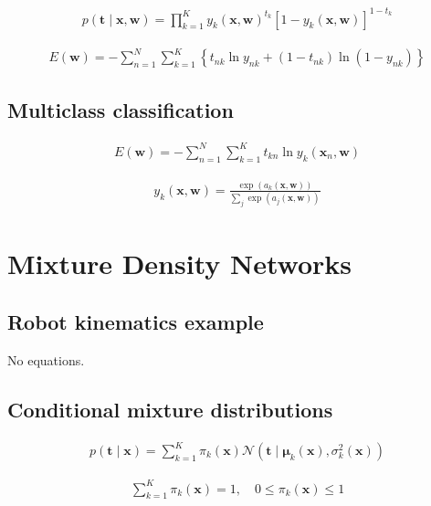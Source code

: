 \documentclass{article}
\begin{document}
\begin{align*}
p(\mathbf{t} \mid \mathbf{x}, \mathbf{w})=\prod_{k=1}^{K} y_{k}(\mathbf{x}, \mathbf{w})^{t_{k}}\left[ 1-y_{k}(\mathbf{x}, \mathbf{w})\right]^{1-t_{k}} 
\tag{6.34}
\end{align*}

\begin{align*}
E(\mathbf{w})=-\sum_{n=1}^{N} \sum_{k=1}^{K}\left\{t_{n k} \ln y_{n k}+\left(1-t_{n k}\right) \ln \left(1-y_{n k}\right)\right\} 
\tag{6.35}
\end{align*}

\subsection{Multiclass classification}

\begin{align*}
E(\mathbf{w})=-\sum_{n=1}^{N} \sum_{k=1}^{K} t_{k n} \ln y_{k}\left(\mathbf{x}_{n}, \mathbf{w}\right) 
\tag{6.36}
\end{align*}

\begin{align*}
y_{k}(\mathbf{x}, \mathbf{w})=\frac{\exp \left(a_{k}(\mathbf{x}, \mathbf{w})\right)}{\sum_{j} \exp \left(a_{j}(\mathbf{x}, \mathbf{w})\right)} 
\tag{6.37}
\end{align*}

\section{Mixture Density Networks}

\subsection{Robot kinematics example}
No equations.

\subsection{Conditional mixture distributions}

\begin{align*}
p(\mathbf{t} \mid \mathbf{x})=\sum_{k=1}^{K} \pi_{k}(\mathbf{x}) \mathcal{N}\left(\mathbf{t} \mid \boldsymbol{\mu}_{k}(\mathbf{x}), \sigma_{k}^{2}(\mathbf{x})\right) 
\tag{6.38}
\end{align*}

\begin{align*}
\sum_{k=1}^{K} \pi_{k}(\mathbf{x})=1, \quad 0 \leqslant \pi_{k}(\mathbf{x}) \leqslant 1 
\tag{6.39}
\end{align*}
\end{document}
